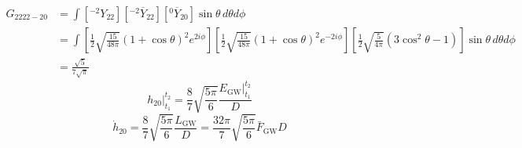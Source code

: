 \documentclass[a3paper]{ctexart}
\begin{document}
\begin{align*}
    G_{2222-20}
    &=\int[{}^{-2}Y_{22}][{}^{-2}\overline{Y}_{22}][{}^{0}\overline{Y}_{20}]\sin\theta\,d\theta d\phi\\
    &=\int[\frac{1}{2}\sqrt{\frac{15}{48\pi}}(1+\cos\theta)^2e^{2i\phi}]
    [\frac{1}{2}\sqrt{\frac{15}{48\pi}}(1+\cos\theta)^2e^{-2i\phi}]
    [\frac{1}{2}\sqrt{\frac{5}{4\pi}}(3\cos^2\theta-1)]\sin\theta\,d\theta d\phi\\
    &=\frac{\sqrt{5}}{7\sqrt{\pi}}
\end{align*}
\begin{equation*}
    h_{20}\vert_{t_1}^{t_2}=\frac{8}{7}\sqrt{\frac{5\pi}{6}}\frac{E_\text{GW}\vert_{t_1}^{t_2}}{D}
\end{equation*}
\begin{equation*}
    \dot{h}_{20}=\frac{8}{7}\sqrt{\frac{5\pi}{6}}\frac{L_\text{GW}}{D}
    =\frac{32\pi}{7}\sqrt{\frac{5\pi}{6}}\bar{F}_\text{GW}D
\end{equation*}
\end{document}
